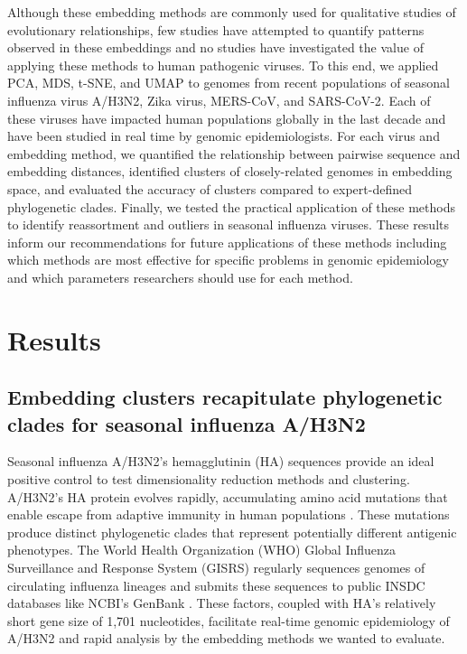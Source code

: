 \documentclass[9pt,lineno]{elife}
\begin{document}
Although these embedding methods are commonly used for qualitative studies of evolutionary relationships, few studies have attempted to quantify patterns observed in these embeddings and no studies have investigated the value of applying these methods to human pathogenic viruses.
To this end, we applied PCA, MDS, t-SNE, and UMAP to genomes from recent populations of seasonal influenza virus A/H3N2, Zika virus, MERS-CoV, and SARS-CoV-2.
Each of these viruses have impacted human populations globally in the last decade and have been studied in real time by genomic epidemiologists.
For each virus and embedding method, we quantified the relationship between pairwise sequence and embedding distances, identified clusters of closely-related genomes in embedding space, and evaluated the accuracy of clusters compared to expert-defined phylogenetic clades.
Finally, we tested the practical application of these methods to identify reassortment and outliers in seasonal influenza viruses.
These results inform our recommendations for future applications of these methods including which methods are most effective for specific problems in genomic epidemiology and which parameters researchers should use for each method.

\section*{Results}

\subsection*{Embedding clusters recapitulate phylogenetic clades for seasonal influenza A/H3N2}

Seasonal influenza A/H3N2's hemagglutinin (HA) sequences provide an ideal positive control to test dimensionality reduction methods and clustering.
A/H3N2's HA protein evolves rapidly, accumulating amino acid mutations that enable escape from adaptive immunity in human populations \citep{flu-review}.
These mutations produce distinct phylogenetic clades that represent potentially different antigenic phenotypes.
The World Health Organization (WHO) Global Influenza Surveillance and Response System (GISRS) regularly sequences genomes of circulating influenza lineages \citep{who-gisrs} and submits these sequences to public INSDC databases like NCBI's GenBank \citep{insdc}.
These factors, coupled with HA's relatively short gene size of 1,701 nucleotides, facilitate real-time genomic epidemiology of A/H3N2 \citep{nextflu,nextstrain} and rapid analysis by the embedding methods we wanted to evaluate.
\end{document}
